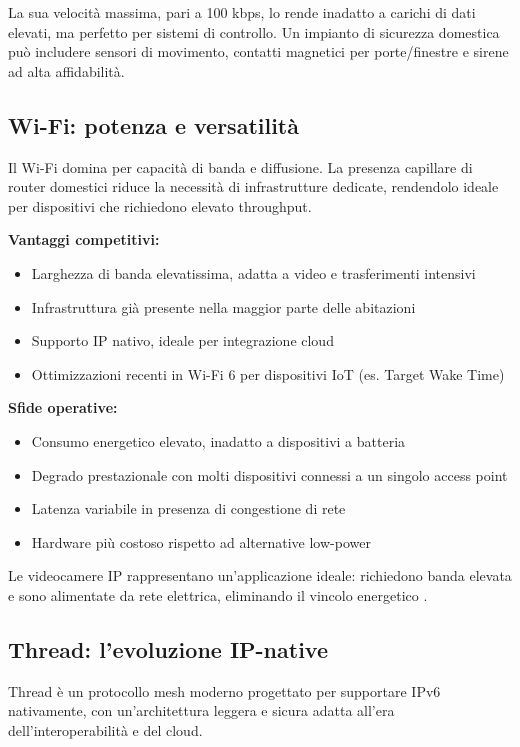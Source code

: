 La sua velocità massima, pari a 100 kbps, lo rende inadatto a carichi di dati elevati, ma perfetto per sistemi di controllo. Un impianto di sicurezza domestica può includere sensori di movimento, contatti magnetici per porte/finestre e sirene ad alta affidabilità.

\subsection{Wi-Fi: potenza e versatilità}

Il Wi-Fi domina per capacità di banda e diffusione. La presenza capillare di router domestici riduce la necessità di infrastrutture dedicate, rendendolo ideale per dispositivi che richiedono elevato throughput.

\textbf{Vantaggi competitivi:}
\begin{itemize}
    \item Larghezza di banda elevatissima, adatta a video e trasferimenti intensivi
    \item Infrastruttura già presente nella maggior parte delle abitazioni
    \item Supporto IP nativo, ideale per integrazione cloud
    \item Ottimizzazioni recenti in Wi-Fi 6 per dispositivi IoT (es. Target Wake Time)
\end{itemize}

\textbf{Sfide operative:}
\begin{itemize}
    \item Consumo energetico elevato, inadatto a dispositivi a batteria
    \item Degrado prestazionale con molti dispositivi connessi a un singolo access point
    \item Latenza variabile in presenza di congestione di rete
    \item Hardware più costoso rispetto ad alternative low-power
\end{itemize}

Le videocamere IP rappresentano un'applicazione ideale: richiedono banda elevata e sono alimentate da rete elettrica, eliminando il vincolo energetico \cite{WiFiVsIoT}.

\subsection{Thread: l'evoluzione IP-native}

Thread è un protocollo mesh moderno progettato per supportare IPv6 nativamente, con un’architettura leggera e sicura adatta all’era dell’interoperabilità e del cloud.

